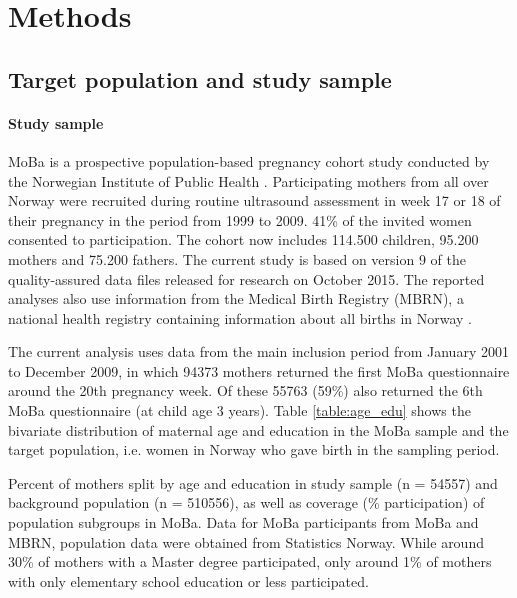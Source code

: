 \documentclass[12pt]{article}
\begin{document}
\section{Methods}

\subsection{Target population and study sample}

\paragraph{Study sample} MoBa is a prospective population-based pregnancy cohort study conducted by the Norwegian Institute of Public Health  \cite{Magnus2006-jj,Magnus2016-ht}. Participating mothers from all over Norway were recruited during routine ultrasound assessment in week 17 or 18 of their pregnancy in the period from 1999 to 2009. 41\% of the invited women consented to participation. The cohort now includes 114.500 children, 95.200 mothers and 75.200 fathers. The current study is based on version 9 of the quality-assured data files released for research on October 2015. The reported analyses also use information from the Medical Birth Registry (MBRN), a national health registry containing information about all births in Norway \cite{Irgens2000-ra}.

The current analysis uses data from the main inclusion period from January 2001 to December 2009, in which 94373 mothers returned the first MoBa questionnaire around the 20th pregnancy week. Of these 55763 (59\%) also returned the 6th MoBa questionnaire (at child age 3 years). Table \ref{table:age_edu} shows the bivariate distribution of maternal age and education in the MoBa sample and the target population, i.e. women in Norway who gave birth in the sampling period.

\begin{table}[ht]
	\caption{Percent of mothers split by age and education in study sample (n = 54557) and background population (n = 510556), as well as coverage (\% participation) of population subgroups in MoBa. Data for MoBa participants from MoBa and MBRN, population data were obtained from Statistics Norway. While around 30\% of mothers with a Master degree participated, only around 1\% of mothers with only elementary school education or less participated.} 
	\label{table:age_edu}
\end{table}
\end{document}
